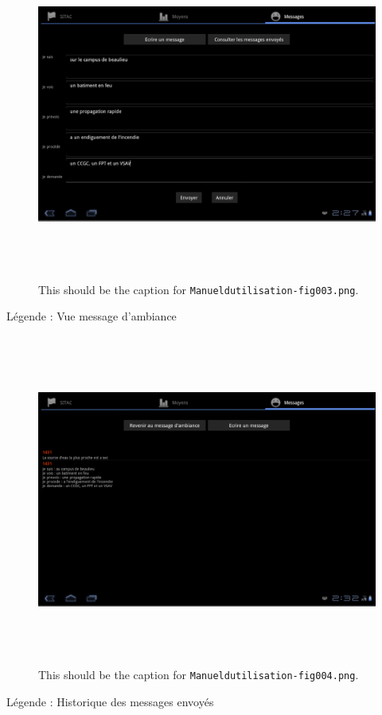 \documentclass{article}
\begin{document}
\begin{figure}[htbp]
\begin{center}
\includegraphics[width=487pt, height=309pt]{Manueldutilisation-fig003.png}
\caption{This should be the caption for \texttt{Manueldutilisation-fig003.png}.}
\end{center}
\end{figure}

\vspace{13pt}
\begin{center}
{\color{color01} Légende : Vue message d'ambiance}

\begin{figure}[htbp]
\begin{center}
\includegraphics[width=487pt, height=309pt]{Manueldutilisation-fig004.png}
\caption{This should be the caption for \texttt{Manueldutilisation-fig004.png}.}
\end{center}
\end{figure}

\vspace{27pt}
{\color{color01} Légende : Historique des messages envoyés\label{h.hz8rv2aeg1kx}\label{h.spjyw5u0mu2u}}
\end{center}
\end{document}
